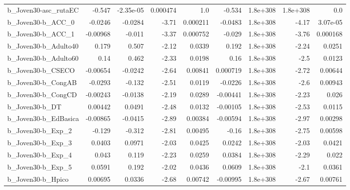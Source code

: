 \begin{tabular}{lrrrrrrrr}
b\_Joven30-asc\_rutaEC         &      -0.547 &    -2.35e-05 &  0.000474 &      1.0 &     -0.534 &    1.8e+308 &     1.8e+308 &           0.0 \\
b\_Joven30-b\_ACC\_0            &     -0.0246 &      -0.0284 &     -3.71 & 0.000211 &    -0.0483 &    1.8e+308 &        -4.17 &      3.07e-05 \\
b\_Joven30-b\_ACC\_1            &    -0.00968 &       -0.011 &     -3.37 & 0.000752 &     -0.029 &    1.8e+308 &        -3.76 &      0.000168 \\
b\_Joven30-b\_Adulto40         &       0.179 &        0.507 &     -2.12 &   0.0339 &      0.192 &    1.8e+308 &        -2.24 &        0.0251 \\
b\_Joven30-b\_Adulto60         &        0.14 &        0.462 &     -2.33 &   0.0198 &       0.16 &    1.8e+308 &         -2.5 &        0.0123 \\
b\_Joven30-b\_CSECO            &    -0.00654 &      -0.0242 &     -2.64 &  0.00841 &   0.000719 &    1.8e+308 &        -2.72 &       0.00644 \\
b\_Joven30-b\_CongAB           &     -0.0293 &       -0.132 &     -2.51 &   0.0119 &    -0.0226 &    1.8e+308 &         -2.6 &       0.00943 \\
b\_Joven30-b\_CongCD           &    -0.00243 &      -0.0138 &     -2.19 &   0.0289 &   -0.00441 &    1.8e+308 &        -2.23 &         0.026 \\
b\_Joven30-b\_DT               &     0.00442 &       0.0491 &     -2.48 &   0.0132 &   -0.00105 &    1.8e+308 &        -2.53 &        0.0115 \\
b\_Joven30-b\_EdBasica         &    -0.00865 &      -0.0415 &     -2.89 &  0.00384 &   -0.00594 &    1.8e+308 &        -2.97 &       0.00298 \\
b\_Joven30-b\_Exp\_2            &      -0.129 &       -0.312 &     -2.81 &  0.00495 &      -0.16 &    1.8e+308 &        -2.75 &       0.00598 \\
b\_Joven30-b\_Exp\_3            &      0.0403 &       0.0971 &     -2.03 &   0.0425 &     0.0242 &    1.8e+308 &        -2.03 &        0.0421 \\
b\_Joven30-b\_Exp\_4            &       0.043 &        0.119 &     -2.23 &   0.0259 &     0.0384 &    1.8e+308 &        -2.29 &         0.022 \\
b\_Joven30-b\_Exp\_5            &      0.0591 &        0.192 &     -2.02 &   0.0436 &     0.0609 &    1.8e+308 &         -2.1 &        0.0361 \\
b\_Joven30-b\_Hpico            &     0.00695 &       0.0336 &     -2.68 &  0.00742 &   -0.00995 &    1.8e+308 &        -2.67 &       0.00761 \\

\end{tabular}

